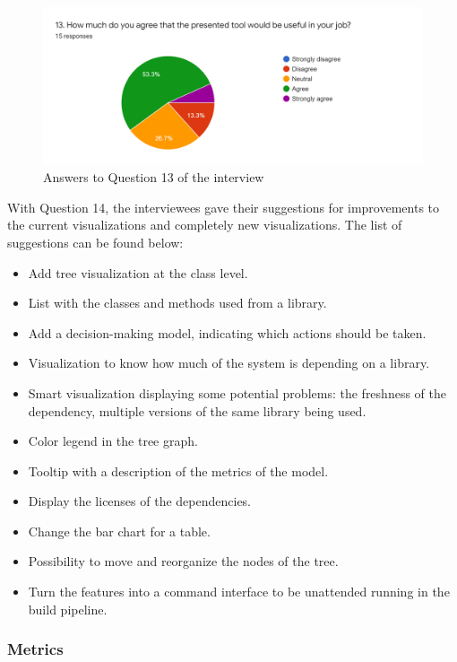 \begin{figure}[ht!]
\begin{center}
\includegraphics[width=\textwidth]{figures/interview/Question13.png}
\caption{Answers to Question 13 of the interview}
\label{fig:interview-13}
\end{center}
\end{figure}

With Question 14, the interviewees gave their suggestions for improvements to the current visualizations and completely new visualizations. The list of suggestions can be found below:

\begin{itemize}
  \item Add tree visualization at the class level.
  \item List with the classes and methods used from a library.
  \item Add a decision-making model, indicating which actions should be taken.
  \item Visualization to know how much of the system is depending on a library.
  \item Smart visualization displaying some potential problems: the freshness of the dependency, multiple versions of the same library being used.
  \item Color legend in the tree graph.
  \item Tooltip with a description of the metrics of the model.
  \item Display the licenses of the dependencies.
  \item Change the bar chart for a table.
  \item Possibility to move and reorganize the nodes of the tree.
  \item Turn the features into a command interface to be unattended running in the build pipeline.
\end{itemize}

\subsubsection{Metrics}


